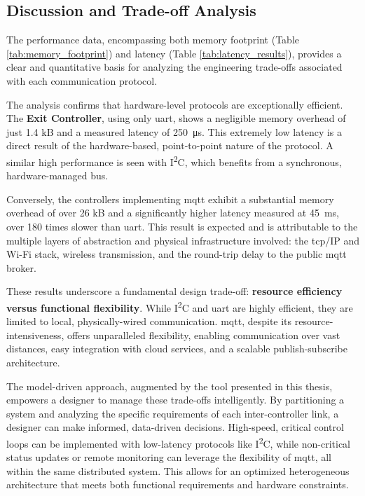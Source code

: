 \subsection{Discussion and Trade-off Analysis}
\label{subsec:discussion}

The performance data, encompassing both memory footprint (Table \ref{tab:memory_footprint}) and latency (Table \ref{tab:latency_results}), provides a clear and quantitative basis for analyzing the engineering trade-offs associated with each communication protocol.

The analysis confirms that hardware-level protocols are exceptionally efficient. The \textbf{Exit Controller}, using only \gls{uart}, shows a negligible memory overhead of just 1.4 kB and a measured latency of \SI{250}{\micro\second}. This extremely low latency is a direct result of the hardware-based, point-to-point nature of the protocol. A similar high performance is seen with I\textsuperscript{2}C, which benefits from a synchronous, hardware-managed bus.

Conversely, the controllers implementing \gls{mqtt} exhibit a substantial memory overhead of over 26 kB and a significantly higher latency measured at \SI{45}{\milli\second}, over 180 times slower than \gls{uart}. This result is expected and is attributable to the multiple layers of abstraction and physical infrastructure involved: the \gls{tcp}/IP and Wi-Fi stack, wireless transmission, and the round-trip delay to the public \gls{mqtt} broker.

These results underscore a fundamental design trade-off: \textbf{resource efficiency versus functional flexibility}. While I\textsuperscript{2}C and \gls{uart} are highly efficient, they are limited to local, physically-wired communication. \gls{mqtt}, despite its resource-intensiveness, offers unparalleled flexibility, enabling communication over vast distances, easy integration with cloud services, and a scalable publish-subscribe architecture.

The model-driven approach, augmented by the tool presented in this thesis, empowers a designer to manage these trade-offs intelligently. By partitioning a system and analyzing the specific requirements of each inter-controller link, a designer can make informed, data-driven decisions. High-speed, critical control loops can be implemented with low-latency protocols like I\textsuperscript{2}C, while non-critical status updates or remote monitoring can leverage the flexibility of \gls{mqtt}, all within the same distributed system. This allows for an optimized heterogeneous architecture that meets both functional requirements and hardware constraints.



